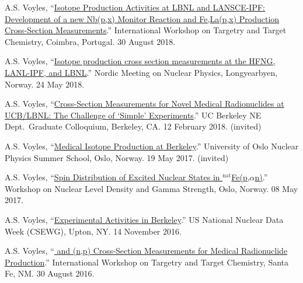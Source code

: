 \begin{bibsection}
\item A.S. Voyles, \enquote{\href{https://slideslive.com/38910297/isotope-production-activities-at-lbnl-and-lansceipf-development-of-a-new-nbpx90mo-monitor-reaction-and-felapx-production-crosssection-measurements}{Isotope Production Activities at LBNL and LANSCE-IPF: Development of a new Nb(p,x) Monitor Reaction and Fe,La(p,x) Production Cross-Section Measurements}.}  International Workshop on Targetry and Target Chemistry, Coimbra, Portugal. 30 August 2018.


\item A.S. Voyles, \enquote{\href{https://indico.cern.ch/event/686407/contributions/2943775/}{Isotope production cross section measurements at the HFNG, LANL-IPF, and LBNL}.}    Nordic Meeting on Nuclear Physics, Longyearbyen, Norway. 24 May 2018.

\item A.S. Voyles, \enquote{\href{https://github.com/avoyles/presentations/blob/master/2018-02-12-UCBNE_colloquium/Voyles_12_Feb_2018_NE_Colloquium_Talk.pdf}{Cross-Section Measurements for Novel Medical Radionuclides at UCB/LBNL: The Challenge of \enquote{Simple} Experiments}.} UC Berkeley NE Dept.\ Graduate Colloquium, Berkeley, CA. 12 February 2018. (invited)

\item A.S. Voyles, \enquote{\href{https://github.com/avoyles/presentations/blob/master/2017-05-19-oslo_summer_school/Voyles_19_May_2017_Oslo_Summer_School.pdf}{Medical Isotope Production at Berkeley}.} University of Oslo Nuclear Physics Summer School, Oslo, Norway.  19 May 2017. (invited)

\item A.S. Voyles, \enquote{\href{http://tid.uio.no/workshop2017/talks/OsloWS17_Voyles.pdf}{Spin Distribution of Excited Nuclear States in $^{\text{nat}}$Fe(p,$\alpha$n)}.}  Workshop on Nuclear Level Density and Gamma Strength, Oslo, Norway. 08 May 2017.


\item A.S. Voyles, \enquote{\href{https://indico.bnl.gov/event/1743/contributions/3189/}{Experimental Activities in Berkeley}.} US National Nuclear Data Week  (CSEWG), Upton, NY. 14 November 2016.


\item A.S. Voyles, \enquote{\href{https://slideslive.com/38898186/64cu-and-47scnp-crosssection-measurements-for-medical-radionuclide-production}{ and  (n,p) Cross-Section Measurements for Medical Radionuclide Production}.}  International Workshop on Targetry and Target Chemistry, Santa Fe, NM. 30 August 2016.


\end{bibsection}
